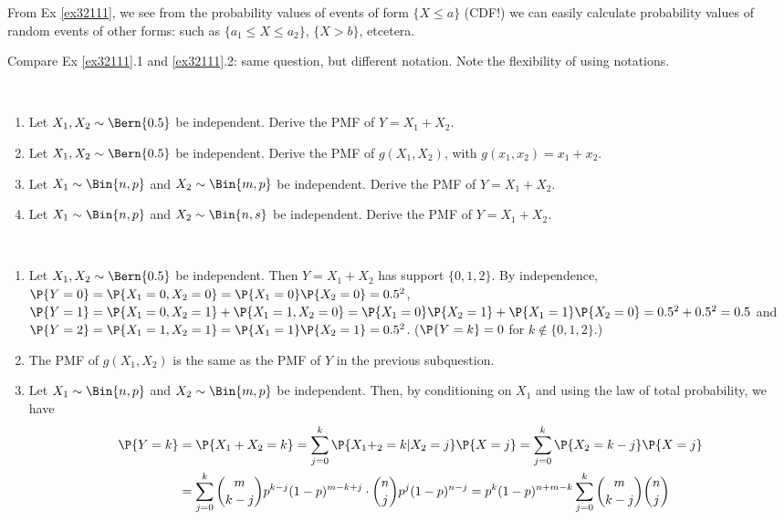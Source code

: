 \begin{remark}
	From Ex \ref{ex32111}, we see from the probability values of events of form $\{X\leq a\}$ (CDF!) we can easily calculate probability values of random events of other forms: such as   $\{a_1\leq X\leq a_2\}$, $\{X>b\}$, etcetera.
\end{remark}

\begin{remark}
	Compare Ex \ref{ex32111}.1 and  \ref{ex32111}.2: same question, but different notation. Note the flexibility of using notations.
\end{remark}

\begin{exercise}~\label{ex3211}
	\begin{enumerate}
 		\item Let $X_1,X_2\sim \Bern{0.5}$ be independent. Derive the PMF of $Y=X_1+X_2$. 
 		\item Let $X_1,X_2\sim \Bern{0.5}$ be independent. Derive the PMF of $g(X_1,X_2)$, with $g(x_1,x_2)=x_1+x_2$.	 
 		\item Let $X_1\sim \Bin{n, p}$ and $X_2\sim \Bin{m, p}$ be independent. Derive the PMF of $Y=X_1+X_2$.
 		\item Let $X_1\sim \Bin{n, p}$ and $X_2\sim \Bin{n, s}$ be independent. Derive the PMF of $Y=X_1+X_2$.
 	\end{enumerate}
 	\begin{solution}~
 		\begin{enumerate}
 			\item Let $X_1,X_2\sim \Bern{0.5}$ be independent. Then $Y = X_1 + X_2$ has support $\{0,1,2\}$. By independence, $\P{Y = 0} = \P{X_1 = 0, X_2 = 0} = \P{X_1 = 0} \P{X_2 = 0} = 0.5^2$, $\P{Y = 1} = \P{X_1 = 0, X_2 = 1} + \P{X_1 = 1, X_2 = 0} = \P{X_1 = 0} \P{X_2 = 1} + \P{X_1 = 1} \P{X_2 = 0}= 0.5^2 + 0.5^2 = 0.5$ and $\P{Y = 2} = \P{X_1 = 1, X_2 = 1} = \P{X_1 = 1} \P{X_2 = 1} = 0.5^2$. ($\P{Y = k} = 0$ for $k \notin \{0, 1, 2\}$.)
 			\item The PMF of $g(X_1,X_2)$ is the same as the PMF of $Y$ in the previous subquestion.
 			\item Let $X_1 \sim \Bin{n, p}$ and $X_2 \sim \Bin{m, p}$ be independent. Then, by conditioning on $X_1$ and using the law of total probability, we have
				 \begin{align*}
					 \P{Y = k} & = \P{X_1 + X_2 = k} = \sum_{j = 0}^k \P{X_1 + _2 = k|X_2=j} \P{X = j} = \sum_{j = 0}^k \P{X_2 = k - j} \P{X = j} \\
					 & = \sum_{j = 0}^k \binom{m}{k - j} p^{k - j} (1 - p)^{m - k + j} \cdot \binom{n}{j} p^j (1 - p)^{n - j} = p^k (1 - p)^{n + m - k} \sum_{j = 0}^k \binom{m}{k - j} \binom{n}{j} \\

\end{align*}
\end{enumerate}
\end{solution}
\end{exercise}

